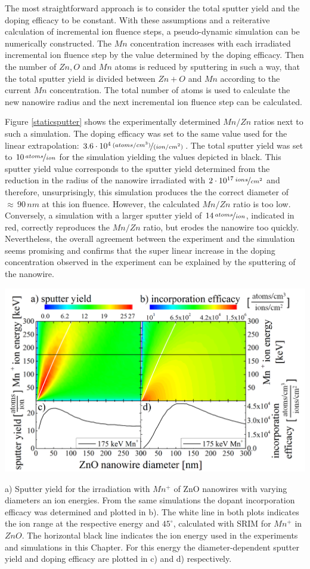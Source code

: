 The most straightforward approach is to consider the total sputter yield and the doping efficacy to be constant. With these assumptions and a reiterative calculation of incremental ion fluence steps, a pseudo-dynamic simulation can be numerically constructed. The $Mn$ concentration increases with each irradiated incremental ion fluence step by the value determined by the doping efficacy. Then the number of $Zn, O$ and $Mn$ atoms is reduced by sputtering in such a way, that the total sputter yield is divided between $Zn+O$ and $Mn$ according to the current $Mn$ concentration. The total number of atoms is used to calculate the new nanowire radius and the next incremental ion fluence step can be calculated.

Figure \ref{staticsputter} shows the experimentally determined $Mn/Zn$ ratios next to such a simulation. The doping efficacy was set to the same value used for the linear extrapolation: $3.6\cdot10^4\,\nicefrac{(atoms/cm^3)}{(ion/cm^2)}$. The total sputter yield was set to $10\,\nicefrac{atoms}{ion}$ for the simulation yielding the values depicted in black. This sputter yield value corresponds to the sputter yield determined from the reduction in the radius of the nanowire irradiated with $2\cdot10^{17}\,\nicefrac{ions}{cm^2}$ and therefore, unsurprisingly, this simulation produces the the correct diameter of $\approx\,90\,nm$ at this ion fluence. However, the calculated $Mn/Zn$ ratio is too low. Conversely, a simulation with a larger sputter yield of $14\,\nicefrac{atoms}{ion}$, indicated in red, correctly reproduces the $Mn/Zn$ ratio, but erodes the nanowire too quickly. Nevertheless, the overall agreement between the experiment and the simulation seems promising and confirms that the super linear increase in the doping concentration observed in the experiment can be explained by the sputtering of the nanowire.

\begin{Figure}
	\centering
		\includegraphics[width=.8\textwidth]{images/sputterincorporate.png}
	\caption{a) Sputter yield for the irradiation with $Mn^+$ of ZnO nanowires with varying diameters an ion energies. From the same simulations the dopant incorporation efficacy was determined and plotted in b). The white line in both plots indicates the ion range at the respective energy and $45^\circ$, calculated with SRIM for $Mn^+$ in $ZnO$. The horizontal black line indicates the ion energy used in the experiments and simulations in this Chapter. For this energy the diameter-dependent sputter yield and doping efficacy are plotted in c) and d) respectively.}
	\label{sputterincorporate}
\end{Figure} 

